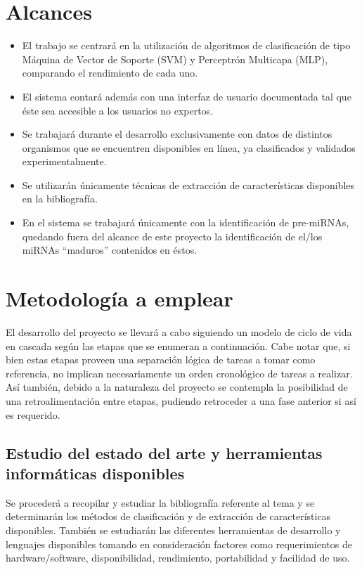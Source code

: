 \documentclass[12pt,bibliography=oldstyle,DIV=12,parskip=full-,titlepage]{scrartcl}
\begin{document}
\section{Alcances}
\begin{itemize}
\item El trabajo se centrará en la utilización de algoritmos de
  clasificación de tipo Máquina de Vector de Soporte (SVM) y
  Perceptrón Multicapa (MLP), comparando el rendimiento de cada uno.
\item El sistema contará además con una interfaz de usuario
  documentada tal que éste sea accesible a los usuarios no expertos.
\item Se trabajará durante el desarrollo exclusivamente con datos de
  distintos organismos que se encuentren disponibles en línea, ya
  clasificados y validados experimentalmente.
\item Se utilizarán únicamente técnicas de extracción de
  características disponibles en la bibliografía.
\item En el sistema se trabajará únicamente con la identificación de
  pre-miRNAs, quedando fuera del alcance de este proyecto la
  identificación de el/los miRNAs ``maduros'' contenidos en éstos.
\end{itemize}
%
%
\section{Metodología a emplear}
El desarrollo del proyecto se llevará a cabo siguiendo un modelo de
ciclo de vida en cascada según las etapas que se enumeran a
continuación.  Cabe notar que, si bien estas etapas proveen una
separación lógica de tareas a tomar como referencia, no implican
necesariamente un orden cronológico de tareas a realizar. Así también,
debido a la naturaleza del proyecto se contempla la posibilidad de una
retroalimentación entre etapas, pudiendo retroceder a una fase
anterior si así es requerido.
%
\subsection{Estudio del estado del arte y herramientas informáticas
  disponibles}
Se procederá a recopilar y estudiar la bibliografía referente al tema
y se determinarán los métodos de clasificación y de extracción de
características disponibles. También se estudiarán las diferentes
herramientas de desarrollo y lenguajes disponibles tomando en
consideración factores como requerimientos de hardware/software,
disponibilidad, rendimiento, portabilidad y facilidad de uso.
%
\end{document}
